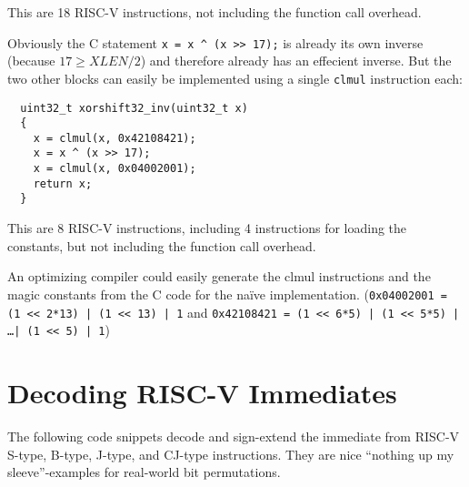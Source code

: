 This are 18 RISC-V instructions, not including the function call overhead.

Obviously the C statement {\tt x = x \^{} (x >> 17);} is already its own inverse
(because $17 \ge XLEN/2$) and therefore already has an effecient inverse. But the two
other blocks can easily be implemented using a single {\tt clmul} instruction each:

\begin{minipage}{\linewidth}
\begin{verbatim}
  uint32_t xorshift32_inv(uint32_t x)
  {
    x = clmul(x, 0x42108421);
    x = x ^ (x >> 17);
    x = clmul(x, 0x04002001);
    return x;
  }
\end{verbatim}
\end{minipage}

This are 8 RISC-V instructions, including 4 instructions for loading the
constants, but not including the function call overhead.

An optimizing compiler could easily generate the clmul instructions and the magic
constants from the C code for the na\"ive implementation. ({\tt 0x04002001 = (1 << 2*13) | (1 << 13) | 1}
and {\tt 0x42108421 = (1 << 6*5) | (1 << 5*5) | \dots | (1 << 5) | 1})

\section{Decoding RISC-V Immediates}

The following code snippets decode and sign-extend the immediate from RISC-V
S-type, B-type, J-type, and CJ-type instructions. They are nice ``nothing up my
sleeve''-examples for real-world bit permutations.

